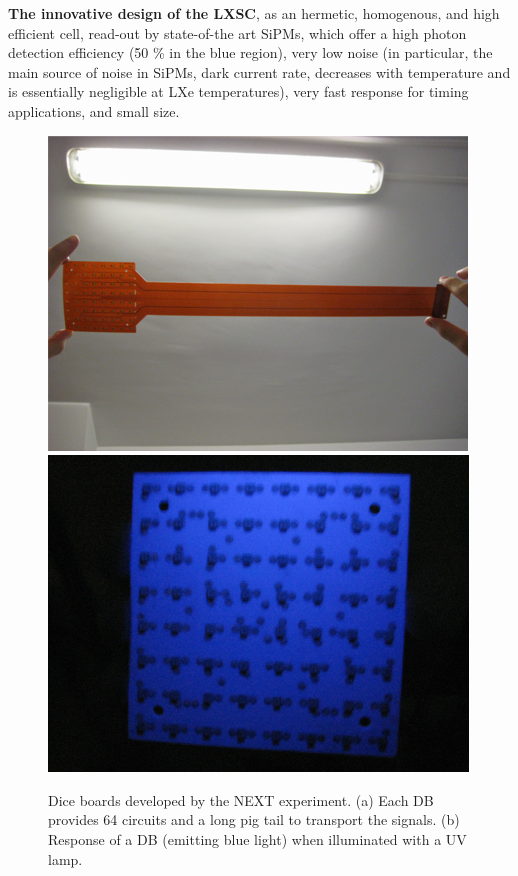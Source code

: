 \documentclass[11pt,a4paper]{article}
\begin{document}
{\bf The innovative design of the LXSC}, as an hermetic, homogenous, and high efficient cell, read-out by state-of-the art SiPMs, which offer a high photon detection efficiency (50 \% in the blue region), very low noise (in particular, the main source of noise in SiPMs, dark current rate, decreases with temperature and is essentially negligible at LXe temperatures), very fast response for timing applications, and small size. 

\begin{figure}[!htb]
	\centering
	\includegraphics[width=.4\textwidth]{img/KDBWithPigTail.png}
    	\includegraphics[width=.4\textwidth]{img/DC2.png}
	\caption{\label{fig.DB} Dice boards developed by the NEXT experiment. (a) Each DB provides 64 circuits and a long pig tail to transport the signals. (b) Response of a DB (emitting blue light) when illuminated with a UV lamp.}
\end{figure}
\end{document}
